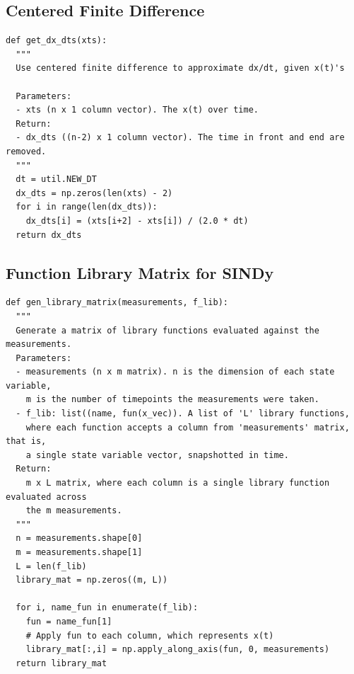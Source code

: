 \documentclass[letterpaper, 10 pt, conference]{ieeeconf}  %
\begin{document}
\subsection*{Centered Finite Difference}
\begin{verbatim}
def get_dx_dts(xts):
  """
  Use centered finite difference to approximate dx/dt, given x(t)'s
  
  Parameters:
  - xts (n x 1 column vector). The x(t) over time.
  Return:
  - dx_dts ((n-2) x 1 column vector). The time in front and end are removed.
  """
  dt = util.NEW_DT
  dx_dts = np.zeros(len(xts) - 2)
  for i in range(len(dx_dts)):
    dx_dts[i] = (xts[i+2] - xts[i]) / (2.0 * dt)
  return dx_dts
\end{verbatim}

\subsection*{Function Library Matrix for SINDy}
\begin{verbatim}
def gen_library_matrix(measurements, f_lib):
  """
  Generate a matrix of library functions evaluated against the measurements.
  Parameters:
  - measurements (n x m matrix). n is the dimension of each state variable,
    m is the number of timepoints the measurements were taken.
  - f_lib: list((name, fun(x_vec)). A list of 'L' library functions,
    where each function accepts a column from 'measurements' matrix, that is,
    a single state variable vector, snapshotted in time.
  Return:
    m x L matrix, where each column is a single library function evaluated across
    the m measurements.
  """
  n = measurements.shape[0]
  m = measurements.shape[1]
  L = len(f_lib)
  library_mat = np.zeros((m, L))
  
  for i, name_fun in enumerate(f_lib):
    fun = name_fun[1]
    # Apply fun to each column, which represents x(t)
    library_mat[:,i] = np.apply_along_axis(fun, 0, measurements)
  return library_mat
\end{verbatim}
\end{document}

